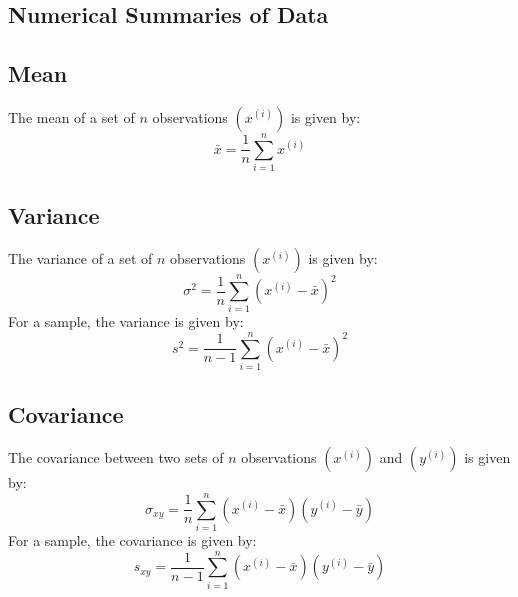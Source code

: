 \documentclass{article}
\begin{document}
\begin{appendix}
    \section{Numerical Summaries of Data}\label{appendix:numerical-summaries}
    \subsection{Mean}
    The mean of a set of \(n\) observations \(\left( x^{\left( i
    \right)} \right)\) is given by:
    \begin{equation*}
        \bar{x} = \frac{1}{n} \sum_{i = 1}^n x^{\left( i \right)}
    \end{equation*}
    \subsection{Variance}
    The variance of a set of \(n\) observations \(\left( x^{\left( i
    \right)} \right)\) is given by:
    \begin{equation*}
        \sigma^2 = \frac{1}{n} \sum_{i = 1}^n {\left( x^{\left( i \right)} - \bar{x} \right)}^2
    \end{equation*}
    For a sample, the variance is given by:
    \begin{equation*}
        s^2 = \frac{1}{n - 1} \sum_{i = 1}^n {\left( x^{\left( i \right)} - \bar{x} \right)}^2
    \end{equation*}
    \subsection{Covariance}
    The covariance between two sets of \(n\) observations \(\left(
    x^{\left( i \right)} \right)\) and \(\left( y^{\left( i \right)}
    \right)\) is given by:
    \begin{equation*}
        \sigma_{xy} = \frac{1}{n} \sum_{i = 1}^n \left( x^{\left( i \right)} - \bar{x} \right) \left( y^{\left( i \right)} - \bar{y} \right)
    \end{equation*}
    For a sample, the covariance is given by:
    \begin{equation*}
        s_{xy} = \frac{1}{n - 1} \sum_{i = 1}^n \left( x^{\left( i \right)} - \bar{x} \right) \left( y^{\left( i \right)} - \bar{y} \right)
    \end{equation*}
\end{appendix}
\end{document}
